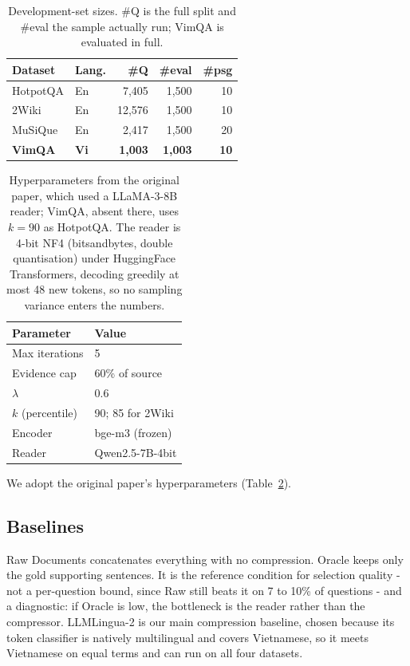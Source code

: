 \documentclass{llncs}
\begin{document}
\begin{table}[t]
\centering
\caption{Development-set sizes. \#Q is the full split and \#eval the sample
actually run; VimQA is evaluated in full.}
\label{tab:datasets}
\small
\begin{tabular}{llrrr}
\toprule
Dataset & Lang. & \#Q & \#eval & \#psg \\
\midrule
HotpotQA \cite{yang2018hotpotqa} & En & 7,405  & 1,500 & 10 \\
2Wiki \cite{ho2020constructing} & En & 12,576 & 1,500 & 10 \\
MuSiQue \cite{trivedi2022musique} & En & 2,417  & 1,500 & 20 \\
\textbf{VimQA} \cite{le2022vimqa} & \textbf{Vi} & \textbf{1,003} & \textbf{1,003} & \textbf{10} \\
\bottomrule
\end{tabular}
\end{table}

\begin{table}[t]
\centering
\caption{Hyperparameters from the original paper, which used a LLaMA-3-8B
reader; VimQA, absent there, uses $k=90$ as HotpotQA. The reader is 4-bit NF4
(bitsandbytes, double quantisation) under HuggingFace Transformers, decoding
greedily at most 48 new tokens, so no sampling variance enters the numbers.}
\label{tab:hyper}
\small
\begin{tabular}{l@{\hspace{2em}}l}
\toprule
Parameter & Value \\
\midrule
Max iterations & 5 \\
Evidence cap & 60\% of source \\
$\lambda$ & 0.6 \\
$k$ (percentile) & 90; 85 for 2Wiki \\
Encoder & bge-m3 (frozen) \\
Reader & Qwen2.5-7B-4bit \\
\bottomrule
\end{tabular}
\end{table}

We adopt the original paper's hyperparameters (Table~\ref{tab:hyper}).

\subsection{Baselines}
Raw Documents concatenates everything with no compression. Oracle
keeps only the gold supporting sentences. It is the reference condition for
selection quality - not a per-question bound, since Raw still beats it on 7 to
10\% of questions - and a diagnostic: if Oracle is low, the bottleneck is the
reader rather than the compressor. LLMLingua-2
\cite{pan2024llmlingua2} is our main compression baseline, chosen because its
token classifier is natively multilingual and covers Vietnamese, so it meets
Vietnamese on equal terms and can run on all four datasets.
\end{document}

